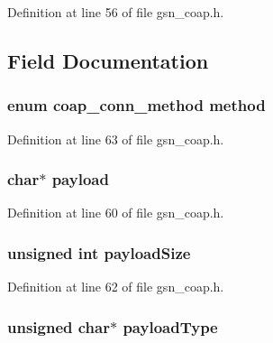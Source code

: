 Definition at line 56 of file gsn\_\-coap.h.



\subsection{Field Documentation}
\hypertarget{a00040_a082b4f8f68989edcecc0e9f24f219b12}{
\subsubsection[{method}]{\setlength{\rightskip}{0pt plus 5cm}enum {\bf coap\_\-conn\_\-method} {\bf method}}}
\label{a00040_a082b4f8f68989edcecc0e9f24f219b12}


Definition at line 63 of file gsn\_\-coap.h.

\hypertarget{a00040_a18f141cb2726073503afb9f1d6c85efb}{
\subsubsection[{payload}]{\setlength{\rightskip}{0pt plus 5cm}char$\ast$ {\bf payload}}}
\label{a00040_a18f141cb2726073503afb9f1d6c85efb}


Definition at line 60 of file gsn\_\-coap.h.

\hypertarget{a00040_aaeb932b3bf79799bf0ee8a418682d486}{
\subsubsection[{payloadSize}]{\setlength{\rightskip}{0pt plus 5cm}unsigned int {\bf payloadSize}}}
\label{a00040_aaeb932b3bf79799bf0ee8a418682d486}


Definition at line 62 of file gsn\_\-coap.h.

\hypertarget{a00040_a11d323097991f661a8433d7a8de8d401}{
\subsubsection[{payloadType}]{\setlength{\rightskip}{0pt plus 5cm}unsigned char$\ast$ {\bf payloadType}}}
\label{a00040_a11d323097991f661a8433d7a8de8d401}



